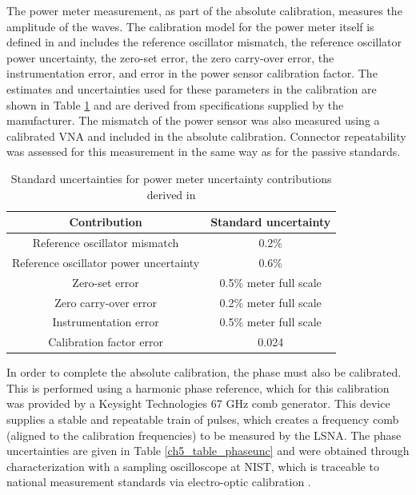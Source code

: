 \documentclass[../thesis/thesis.tex]{subfiles}
\begin{document}
\begin{refsection}
The power meter measurement, as part of the absolute calibration, measures the amplitude of the waves. The calibration model for the power meter itself is defined in \cite{Keysight_2017} and includes the reference oscillator mismatch, the reference oscillator power uncertainty, the zero-set error, the zero carry-over error, the instrumentation error, and error in the power sensor calibration factor. The estimates and uncertainties used for these parameters in the calibration are shown in Table \ref{ch5_table_powerunc} and are derived from specifications supplied by the manufacturer. The mismatch of the power sensor was also measured using a calibrated VNA and included in the absolute calibration. Connector repeatability was assessed for this measurement in the same way as for the passive standards.

\begin{table}[]
	\centering
	\caption{Standard uncertainties for power meter uncertainty contributions derived in \cite{Keysight_2017}}
	\label{ch5_table_powerunc}
	\begin{tabular}{cc}
		\hline
		Contribution                           & Standard uncertainty \\ \hline
		Reference oscillator mismatch          & 0.2\%                \\
		Reference oscillator power uncertainty & 0.6\%                \\
		Zero-set error                         & 0.5\% meter full scale \\
		Zero carry-over error                  & 0.2\% meter full scale \\
		Instrumentation error                  & 0.5\% meter full scale \\
		Calibration factor error               & 0.024               \\ \hline
	\end{tabular}
\end{table}

In order to complete the absolute calibration, the phase must also be calibrated. This is performed using a harmonic phase reference, which for this calibration was provided by a Keysight Technologies 67 GHz comb generator\cite{Keysight_2014}. This device supplies a stable and repeatable train of pulses, which creates a frequency comb (aligned to the calibration frequencies) to be measured by the LSNA. The phase uncertainties are given in Table \ref{ch5_table_phaseunc} and were obtained through characterization with a sampling oscilloscope at NIST, which is traceable to national measurement standards via electro-optic calibration \cite{Reader_2008, Hale_2009}.


\end{refsection}
\end{document}
